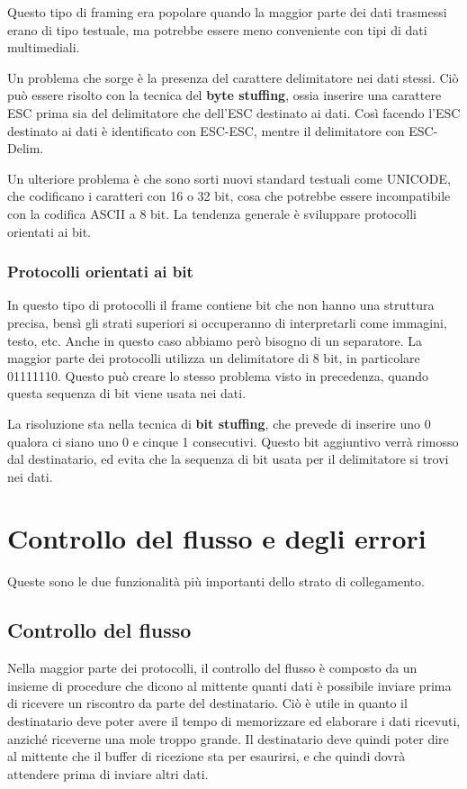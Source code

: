             Questo tipo di framing era popolare quando la maggior parte dei dati trasmessi erano di tipo testuale, ma potrebbe essere meno conveniente con tipi di dati multimediali.
            
            Un problema che sorge è la presenza del carattere delimitatore nei dati stessi. Ciò può essere risolto con la tecnica del \textbf{byte stuffing}, ossia inserire una carattere ESC prima sia del delimitatore che dell'ESC destinato ai dati. Così facendo l'ESC destinato ai dati è identificato con ESC-ESC, mentre il delimitatore con ESC-Delim.
            
            Un ulteriore problema è che sono sorti nuovi standard testuali come UNICODE, che codificano i caratteri con 16 o 32 bit, cosa che potrebbe essere incompatibile con la codifica ASCII a 8 bit. La tendenza generale è sviluppare protocolli orientati ai bit.
        
        \subsubsection{Protocolli orientati ai bit}
            In questo tipo di protocolli il frame contiene bit che non hanno una struttura precisa, bensì gli strati superiori si occuperanno di interpretarli come immagini, testo, etc. Anche in questo caso abbiamo però bisogno di un separatore. La maggior parte dei protocolli utilizza un delimitatore di 8 bit, in particolare 01111110. Questo può creare lo stesso problema visto in precedenza, quando questa sequenza di bit viene usata nei dati.
            
            La risoluzione sta nella tecnica di \textbf{bit stuffing}, che prevede di inserire uno 0 qualora ci siano uno 0 e cinque 1 consecutivi. Questo bit aggiuntivo verrà rimosso dal destinatario, ed evita che la sequenza di bit usata per il delimitatore si trovi nei dati.
            
\section{Controllo del flusso e degli errori}
    Queste sono le due funzionalità più importanti dello strato di collegamento.
    
    \subsection{Controllo del flusso}
        Nella maggior parte dei protocolli, il controllo del flusso è composto da un insieme di procedure che dicono al mittente quanti dati è possibile inviare prima di ricevere un riscontro da parte del destinatario. Ciò è utile in quanto il destinatario deve poter avere il tempo di memorizzare ed elaborare i dati ricevuti, anziché riceverne una mole troppo grande. Il destinatario deve quindi poter dire al mittente che il buffer di ricezione sta per esaurirsi, e che quindi dovrà attendere prima di inviare altri dati.
        
